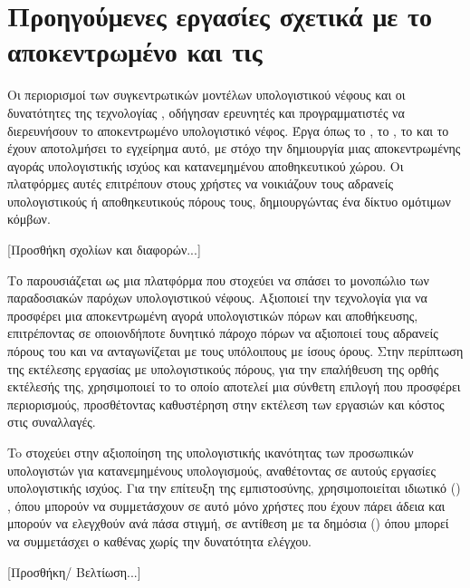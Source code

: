 \section{Προηγούμενες εργασίες σχετικά με το αποκεντρωμένο  και τις }
Οι περιορισμοί των συγκεντρωτικών μοντέλων υπολογιστικού νέφους και οι 
δυνατότητες της τεχνολογίας , οδήγησαν ερευνητές και 
προγραμματιστές να διερευνήσουν το αποκεντρωμένο υπολογιστικό νέφος. 
Έργα όπως το , το , το  και το  
έχουν αποτολμήσει το εγχείρημα αυτό, με στόχο την δημιουργία μιας 
αποκεντρωμένης αγοράς υπολογιστικής ισχύος και κατανεμημένου αποθηκευτικού 
χώρου.
Οι πλατφόρμες αυτές επιτρέπουν στους χρήστες να νοικιάζουν τους αδρανείς 
υπολογιστικούς ή αποθηκευτικούς πόρους τους, δημιουργώντας ένα δίκτυο 
ομότιμων κόμβων.

[Προσθήκη σχολίων και διαφορών...]

Το  παρουσιάζεται ως μια πλατφόρμα που στοχεύει να σπάσει 
το μονοπώλιο των παραδοσιακών παρόχων υπολογιστικού νέφους. Αξιοποιεί 
την τεχνολογία  για να προσφέρει μια αποκεντρωμένη αγορά 
υπολογιστικών πόρων και αποθήκευσης, επιτρέποντας σε οποιονδήποτε δυνητικό 
πάροχο πόρων να αξιοποιεί τους αδρανείς πόρους του και να ανταγωνίζεται με 
τους υπόλοιπους με ίσους όρους. Στην περίπτωση της εκτέλεσης εργασίας με 
υπολογιστικούς πόρους, για την επαλήθευση της ορθής εκτέλεσής της, 
χρησιμοποιεί το  το οποίο αποτελεί μια σύνθετη επιλογή που προσφέρει περιορισμούς, προσθέτοντας καθυστέρηση στην εκτέλεση των εργασιών και κόστος στις συναλλαγές.

To  στοχεύει στην αξιοποίηση της υπολογιστικής ικανότητας 
των προσωπικών υπολογιστών για κατανεμημένους υπολογισμούς, αναθέτοντας 
σε αυτούς εργασίες υπολογιστικής ισχύος. Για την επίτευξη της εμπιστοσύνης, 
χρησιμοποιείται ιδιωτικό () , όπου μπορούν να 
συμμετάσχουν σε αυτό μόνο χρήστες που έχουν πάρει άδεια και μπορούν να 
ελεγχθούν ανά πάσα στιγμή, σε αντίθεση με τα δημόσια () 
 όπου μπορεί να συμμετάσχει ο καθένας χωρίς την δυνατότητα 
ελέγχου.

[Προσθήκη/ Βελτίωση...]